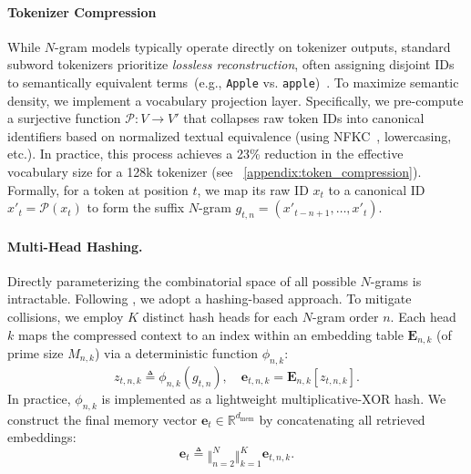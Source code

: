 \paragraph{Tokenizer Compression}
While $N$-gram models typically operate directly on tokenizer outputs, standard subword tokenizers prioritize \textit{lossless reconstruction}, often assigning disjoint IDs to semantically equivalent terms~(e.g., \texttt{Apple} vs. \texttt{\textvisiblespace apple})~\citep{kudo2018sentencepiecesimplelanguageindependent,li2023starcodersourceyou}. To maximize semantic density, we implement a vocabulary projection layer. Specifically, we pre-compute a surjective function $\mathcal{P}: V \to V'$ that collapses raw token IDs into canonical identifiers based on normalized textual equivalence (using NFKC~\citep{UAX15-NFKC}, lowercasing, etc.). In practice, this process achieves a 23\% reduction in the effective vocabulary size for a 128k tokenizer (see ~\autoref{appendix:token_compression}). 
Formally, for a token at position $t$, we map its raw ID $x_t$ to a canonical ID $x'_t = \mathcal{P}(x_t)$ to form the suffix $N$-gram $g_{t,n} = (x'_{t-n+1}, \dots, x'_t)$.




\paragraph{Multi-Head Hashing.}

Directly parameterizing the combinatorial space of all possible $N$-grams is intractable. Following \citet{tito2017hash}, we adopt a hashing-based approach. To mitigate collisions, we employ $K$ distinct hash heads for each $N$-gram order $n$. Each head $k$ maps the compressed context to an index within an embedding table $\mathbf{E}_{n,k}$ (of prime size $M_{n,k}$) via a deterministic function $\phi_{n,k}$:
\begin{equation}
    z_{t,n,k} \triangleq \phi_{n,k}(g_{t,n}), \quad
    \mathbf{e}_{t,n,k} = \mathbf{E}_{n,k}[z_{t,n,k}].
\end{equation}
In practice, $\phi_{n,k}$ is implemented as a lightweight multiplicative-XOR hash. We construct the final memory vector $\mathbf{e}_t \in \mathbb{R}^{d_{\text{mem}}}$ by concatenating all retrieved embeddings:
\begin{equation}
    \mathbf{e}_t \triangleq \mathop{\Vert}_{n=2}^{N} \mathop{\Vert}_{k=1}^{K} \mathbf{e}_{t,n,k}.
\end{equation}




